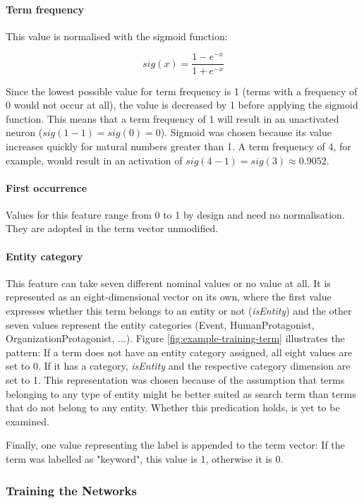 \documentclass[11pt,a4paper,twoside]{article}
\begin{document}
\paragraph{Term frequency} This value is normalised with the sigmoid function:

\[
sig(x) = \frac{1 - e^{-x}}{1 + e^{-x}}
\]

\noindent Since the lowest possible value for term frequency is 1 (terms with a frequency of 0 would not occur at all), the value is decreased by 1 before applying the sigmoid function. This means that a term frequency of 1 will result in an unactivated neuron ($sig(1-1) = sig(0) = 0$). Sigmoid was chosen because its value increases quickly for natural numbers greater than 1. A term frequency of 4, for example, would result in an activation of $sig(4-1) = sig(3) \approx 0.9052$.

\paragraph{First occurrence} Values for this feature range from 0 to 1 by design and need no normalisation. They are adopted in the term vector unmodified.

\paragraph{Entity category} This feature can take seven different nominal values or no value at all. It is represented as an eight-dimensional vector on its own, where the first value expresses whether this term belongs to an entity or not (\emph{isEntity}) and the other seven values represent the entity categories (Event, HumanProtagonist, OrganizationProtagonist, ...). Figure \ref{fig:example-training-term} illustrates the pattern: If a term does not have an entity category assigned, all eight values are set to 0. If it has a category, \emph{isEntity} and the respective category dimension are set to 1. This representation was chosen because of the assumption that terms belonging to any type of entity might be better suited as search term than terms that do not belong to any entity. Whether this predication holds, is yet to be examined. 

\bigskip

\noindent Finally, one value representing the label is appended to the term vector: If the term was labelled as "keyword", this value is 1, otherwise it is 0.

\subsubsection{Training the Networks} \label{SystemTrainTrain}
\end{document}
